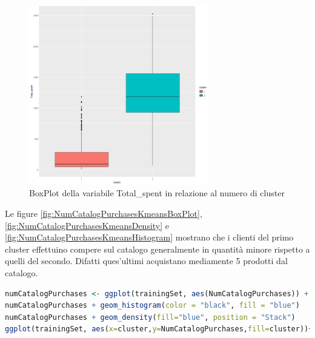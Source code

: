 \documentclass[letterpaper,11pt]{article}
\begin{document}
\begin{figure}[H]
    \centering
    \includegraphics[width=0.7\textwidth]{Img/K-MEANS/KMEANS015.png}
    \caption{BoxPlot della variabile Total\_spent in relazione al numero di cluster}
    \label{fig:TotalSpentKmeansBoxPlot}
\end{figure}

Le figure \ref{fig:NumCatalogPurchasesKmeansBoxPlot}, \ref{fig:NumCatalogPurchasesKmeansDensity} e \ref{fig:NumCatalogPurchasesKmeansHistogram} mostrano che i clienti del primo cluster effettuino compere sul catalogo generalmente in quantità minore rispetto a quelli del secondo. Difatti ques'ultimi acquistano mediamente 5 prodotti dal catalogo.
\begin{lstlisting}[language=R]
numCatalogPurchases <- ggplot(trainingSet, aes(NumCatalogPurchases)) +  facet_grid(cluster~.)
numCatalogPurchases + geom_histogram(color = "black", fill = "blue") 
numCatalogPurchases + geom_density(fill="blue", position = "Stack")
ggplot(trainingSet, aes(x=cluster,y=NumCatalogPurchases,fill=cluster))+geom_boxplot(outlier.colour="black") + ylim(0,10)
\end{lstlisting}
\end{document}
